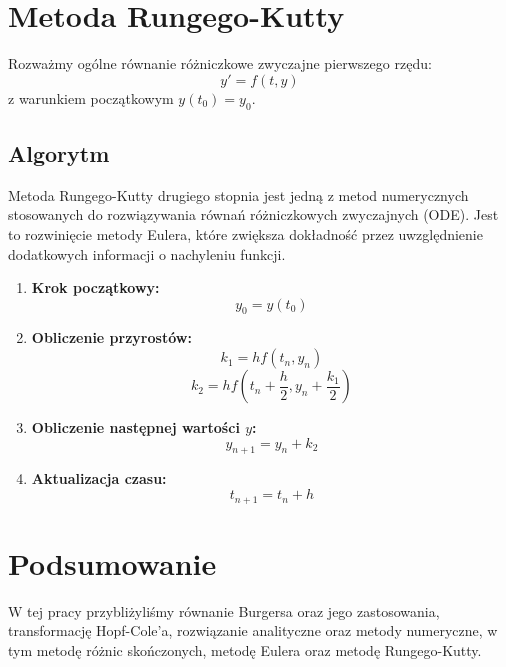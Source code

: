 \documentclass[a4paper,12pt]{article}
\begin{document}
\section{Metoda Rungego-Kutty}
Rozważmy ogólne równanie różniczkowe zwyczajne pierwszego rzędu:
\begin{equation}
    y' = f(t, y)
\end{equation}
z warunkiem początkowym \( y(t_0) = y_0 \).

\subsection*{Algorytm}
Metoda Rungego-Kutty drugiego stopnia jest jedną z metod numerycznych stosowanych do rozwiązywania równań różniczkowych zwyczajnych (ODE). Jest to rozwinięcie metody Eulera, które zwiększa dokładność przez uwzględnienie dodatkowych informacji o nachyleniu funkcji.
\begin{enumerate}
    \item \textbf{Krok początkowy:} 
    \begin{equation}
        y_0 = y(t_0)
    \end{equation}

    \item \textbf{Obliczenie przyrostów:}
    \begin{equation}
        k_1 = h f(t_n, y_n)
    \end{equation}
    \begin{equation}
        k_2 = h f\left(t_n + \frac{h}{2}, y_n + \frac{k_1}{2}\right)
    \end{equation}

    \item \textbf{Obliczenie następnej wartości \( y \):}
    \begin{equation}
        y_{n+1} = y_n + k_2
    \end{equation}

    \item \textbf{Aktualizacja czasu:}
    \begin{equation}
        t_{n+1} = t_n + h
    \end{equation}
\end{enumerate}

\section{Podsumowanie}
W tej pracy przybliżyliśmy równanie Burgersa oraz jego zastosowania, transformację Hopf-Cole'a, rozwiązanie analityczne oraz metody numeryczne, w tym metodę różnic skończonych, metodę Eulera oraz metodę Rungego-Kutty.
\end{document}
